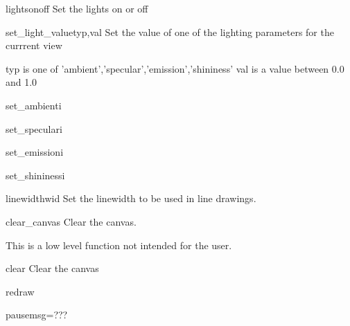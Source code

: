 \begin{funcdesc}{lights}{onoff}
Set the lights on or off

\end{funcdesc}


\begin{funcdesc}{set_light_value}{typ,val}
Set the value of one of the lighting parameters for the currrent view

    typ is one of 'ambient','specular','emission','shininess'
    val is a value between 0.0 and 1.0
    

\end{funcdesc}


\begin{funcdesc}{set_ambient}{i}


\end{funcdesc}


\begin{funcdesc}{set_specular}{i}


\end{funcdesc}


\begin{funcdesc}{set_emission}{i}


\end{funcdesc}


\begin{funcdesc}{set_shininess}{i}


\end{funcdesc}


\begin{funcdesc}{linewidth}{wid}
Set the linewidth to be used in line drawings.

\end{funcdesc}


\begin{funcdesc}{clear_canvas}{}
Clear the canvas.

    This is a low level function not intended for the user.
    

\end{funcdesc}


\begin{funcdesc}{clear}{}
Clear the canvas

\end{funcdesc}


\begin{funcdesc}{redraw}{}


\end{funcdesc}


\begin{funcdesc}{pause}{msg=???}


\end{funcdesc}


